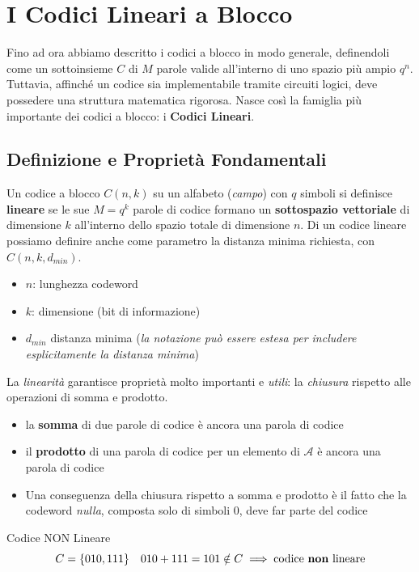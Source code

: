 \section{I Codici Lineari a Blocco}
Fino ad ora abbiamo descritto i codici a blocco in modo generale, definendoli come un sottoinsieme $C$ di $M$ parole valide all'interno di uno spazio più ampio $q^n$. Tuttavia, affinché un codice sia implementabile tramite circuiti logici, deve possedere una struttura matematica rigorosa. Nasce così la famiglia più importante dei codici a blocco: i \textbf{Codici Lineari}.

\subsection{Definizione e Proprietà Fondamentali}
Un codice a blocco $C(n,k)$ su un alfabeto (\textit{campo}) con $q$ simboli si definisce \textbf{lineare} se le sue $M = q^k$ parole di codice formano un \textbf{sottospazio vettoriale} di dimensione $k$ all'interno dello spazio totale di dimensione $n$.
Di un codice lineare possiamo definire anche come parametro la distanza minima richiesta, con $C(n,k,d_{min})$.
\begin{itemize}
    \item $n$: lunghezza codeword
    \item $k$: dimensione (bit di informazione)
    \item $d_{min}$ distanza minima (\textit{la notazione può essere estesa per includere esplicitamente la distanza minima})
\end{itemize}
La \textit{linearità} garantisce proprietà molto importanti e \textit{utili}: la \textit{chiusura} rispetto alle operazioni di somma e prodotto.
\begin{itemize}
    \item la \textbf{somma} di due parole di codice è ancora una parola di codice
    \item il \textbf{prodotto} di una parola di codice per un elemento di $\mathcal{A}$ è ancora una parola di codice
    \item Una conseguenza della chiusura rispetto a somma e prodotto è il fatto che la codeword \textit{nulla}, composta solo di simboli $0$, deve far parte del codice
\end{itemize}

\begin{esempio}{Codice NON Lineare}
\[C=\{010,111\}\quad 010+111= 101 \notin C \implies \text{codice \textbf{non} lineare} \]
\end{esempio}

